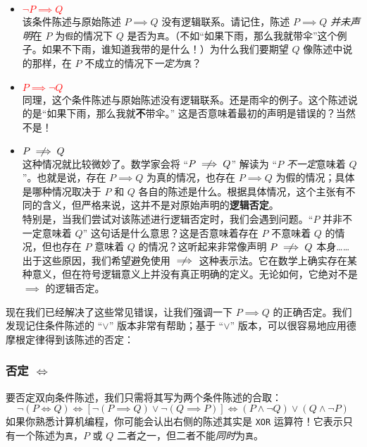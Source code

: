 \begin{itemize}
    \item \textcolor{red}{$\neg P \implies Q$} \\
        该条件陈述与原始陈述 $P \implies Q$ 没有逻辑联系。请记住，陈述 $P \implies Q$ \emph{并未声明}在 $P$ 为\verb|假|的情况下 $Q$ 是否为\verb|真|。（不如``如果下雨，那么我就带伞''这个例子。如果不下雨，谁知道我带的是什么！）为什么我们要期望 $Q$ 像陈述中说的那样，在 $P$ 不成立的情况下\emph{一定为}\verb|真|？
    \item \textcolor{red}{$P \implies \neg Q$} \\
        同理，这个条件陈述与原始陈述没有逻辑联系。还是雨伞的例子。这个陈述说的是``如果下雨，那么我就\textbf{不}带伞。'' 这是否意味着最初的声明是错误的？当然不是！
    \item \textcolor{red}{$P \notimplies Q$} \\
        这种情况就比较微妙了。数学家会将 ``$P \notimplies Q$'' 解读为 ``$P$ \emph{不一定}意味着 $Q$''。也就是说，存在 $P \implies Q$ 为真的情况，也存在 $P \implies Q$ 为假的情况；具体是哪种情况取决于 $P$ 和 $Q$ 各自的陈述是什么。根据具体情况，这个主张有不同的含义，但严格来说，这并不是对原始声明的\textbf{逻辑否定}。\\
        \newline
        特别是，当我们尝试对该陈述进行逻辑否定时，我们会遇到问题。``$P$ 并非不一定意味着 $Q$'' 这句话是什么意思？这是否意味着存在 $P$ 不意味着 $Q$ 的情况，但也存在 $P$ 意味着 $Q$ 的情况？这听起来非常像声明 $P \notimplies Q$ 本身…… \\
        \newline
        出于这些原因，我们希望避免使用 $\notimplies$ 这种表示法。它在数学上确实存在某种意义，但在符号逻辑意义上并没有真正明确的定义。无论如何，它绝对不是 $\implies$ 的逻辑否定。
\end{itemize}
现在我们已经解决了这些常见错误，让我们强调一下 $P \implies Q$ 的正确否定。我们发现记住条件陈述的 ``$\lor$'' 版本非常有帮助；基于 ``$\lor$'' 版本，可以很容易地应用德摩根定律得到该陈述的否定：

\setlength{\fboxrule}{2pt}
\begin{center}
\end{center}

\subsubsection*{否定 $\iff$}

要否定双向条件陈述，我们只需将其写为两个条件陈述的合取：
\[\neg (P \iff Q) \iff [\neg (P \implies Q) \lor \neg (Q \implies P)] \iff (P \land \neg Q) \lor (Q \land \neg P)\]
如果你熟悉计算机编程，你可能会认出右侧的陈述其实是 \verb|XOR| 运算符！它表示只有一个陈述为\verb|真|，$P$ 或 $Q$ 二者之一，但二者不能\emph{同时}为\verb|真|。
